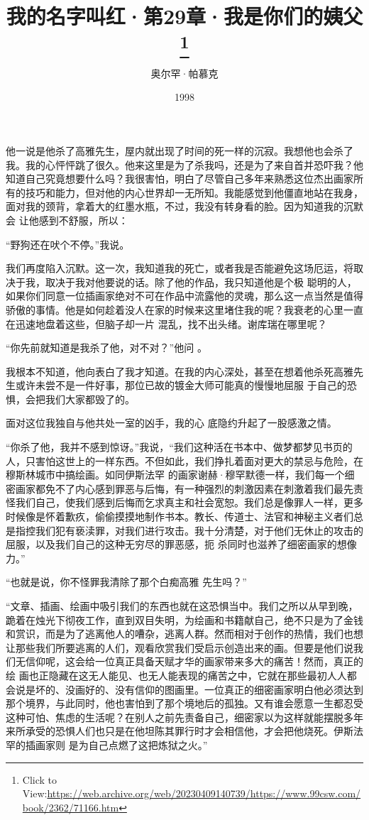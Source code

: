 \documentclass{article}
\title{我的名字叫红·第29章·我是你们的姨父\footnote{Click to View:\url{https://web.archive.org/web/20230409140739/https://www.99csw.com/book/2362/71166.htm}}}
\author{奥尔罕·帕慕克}
\date{1998}
\begin{document}

\maketitle


\Large

﻿他一说是他杀了高雅先生，屋内就出现了时间的死一样的沉寂。我想他也会杀了我。我的心怦怦跳了很久。他来这里是为了杀我吗，还是为了来自首并恐吓我？他知道自己究竟想要什么吗？我很害怕，明白了尽管自己多年来熟悉这位杰出画家所有的技巧和能力，但对他的内心世界却一无所知。我能感觉到他僵直地站在我身，面对我的颈背，拿着大的红墨水瓶，不过，我没有转身看的脸。因为知道我的沉默会
让他感到不舒服，所以： 


“野狗还在吠个不停。”我说。 

我们再度陷入沉默。这一次，我知道我的死亡，或者我是否能避免这场厄运，将取决于我，取决于我对他要说的话。除了他的作品，我只知道他是个极
\newpage
聪明的人，如果你们同意一位插画家绝对不可在作品中流露他的灵魂，那么这一点当然是值得骄傲的事情。他是如何趁着没人在家的时候来这里堵住我的呢？我衰老的心里一直在迅速地盘着这些，但脑子却一片
混乱，找不出头绪。谢库瑞在哪里呢？ 

“你先前就知道是我杀了他，对不对？”他问
。 

我根本不知道，他向表白了我才知道。在我的内心深处，甚至在想着他杀死高雅先生或许未尝不是一件好事，那位已故的镀金大师可能真的慢慢地屈服
于自己的恐惧，会把我们大家都毁了的。 

面对这位我独自与他共处一室的凶手，我的心
底隐约升起了一股感激之情。 

“你杀了他，我并不感到惊讶。”我说，“我们这种活在书本中、做梦都梦见书页的人，只害怕这世上的一样东西。不但如此，我们挣扎着面对更大的禁忌与危险，在穆斯林城市中搞绘画。如同伊斯法罕
\newpage
的画家谢赫·穆罕默德一样，我们每一个细密画家都免不了内心感到罪恶与后悔，有一种强烈的刺激因素在刺激着我们最先责怪我们自己，使我们感到后悔而乞求真主和社会宽恕。我们总是像罪人一样，更多时候像是怀着歉疚，偷偷摸摸地制作书本。教长、传道士、法官和神秘主义者们总是指控我们犯有亵渎罪，对我们进行攻击。我十分清楚，对于他们无休止的攻击的屈服，以及我们自己的这种无穷尽的罪恶感，扼
杀同时也滋养了细密画家的想像力。” 

“也就是说，你不怪罪我清除了那个白痴高雅
先生吗？” 

“文章、插画、绘画中吸引我们的东西也就在这恐惧当中。我们之所以从早到晚，跪着在烛光下彻夜工作，直到双目失明，为绘画和书籍献自己，绝不只是为了金钱和赏识，而是为了逃离他人的嘈杂，逃离人群。然而相对于创作的热情，我们也想让那些我们所要逃离的人们，观看欣赏我们受启示创造出来的画。但要是他们说我们无信仰呢，这会给一位真正具备天赋才华的画家带来多大的痛苦！然而，真正的绘
\newpage
画也正隐藏在这无人能见、也无人能表现的痛苦之中，它就在那些最初人人都会说是坏的、没画好的、没有信仰的图画里。一位真正的细密画家明白他必须达到那个境界，与此同时，他也害怕到了那个境地后的孤独。又有谁会愿意一生都忍受这种可怕、焦虑的生活呢？在别人之前先责备自己，细密家以为这样就能摆脱多年来所承受的恐惧人们也只是在他坦陈其罪行时才会相信他，才会把他烧死。伊斯法罕的插画家则
是为自己点燃了这把炼狱之火。” 
\end{document}
